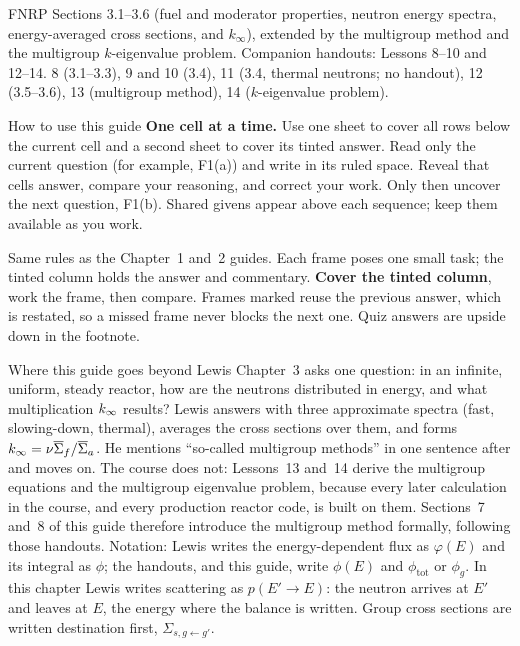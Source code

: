 \documentclass[compact]{ne630handout}
\newcommand{\Sg}[2]{\Sigma_{s,#1\gets#2}}
\begin{document}
 {FNRP Sections 3.1--3.6 (fuel and moderator properties, neutron energy spectra, energy-averaged cross sections, and $k_\infty$), extended by the multigroup method and the multigroup $k$-eigenvalue problem. Companion handouts: Lessons 8--10 and 12--14.}
 {8 (3.1--3.3), 9 and 10 (3.4), 11 (3.4, thermal neutrons; no handout), 12 (3.5--3.6), 13 (multigroup method), 14 ($k$-eigenvalue problem).}

\begin{KeyBox}{How to use this guide}
\ifguidehandwriting
\textbf{One cell at a time.} Use one sheet to cover all rows below the current cell and a second sheet to cover its tinted answer. Read only the current question (for example, F1(a)) and write in its ruled space. Reveal that cell\textquotesingle s answer, compare your reasoning, and correct your work. Only then uncover the next question, F1(b). Shared givens appear above each sequence; keep them available as you work.\par\smallskip
\fi
Same rules as the Chapter~1 and~2 guides. Each frame poses one small task; the tinted column holds the answer and commentary. \textbf{Cover the tinted column}, work the frame, then compare. Frames marked \Chain reuse the previous answer, which is restated, so a missed frame never blocks the next one. Quiz answers are upside down in the footnote.
\end{KeyBox}

\begin{KeyBox}{Where this guide goes beyond Lewis}
Chapter~3 asks one question: in an infinite, uniform, steady reactor, how are the neutrons distributed in energy, and what multiplication $k_\infty$ results? Lewis answers with three approximate spectra (fast, slowing-down, thermal), averages the cross sections over them, and forms $k_\infty=\nu\overline\Sigma_f/\overline\Sigma_a$. He mentions ``so-called multigroup methods'' in one sentence after  and moves on. The course does not: Lessons~13 and~14 derive the multigroup equations and the multigroup eigenvalue problem, because every later calculation in the course, and every production reactor code, is built on them. Sections~7 and~8 of this guide therefore introduce the multigroup method formally, following those handouts. Notation: Lewis writes the energy-dependent flux as $\varphi(E)$ and its integral as $\phi$; the handouts, and this guide, write $\phi(E)$ and $\phi_{\mathrm{tot}}$ or $\phi_g$. In this chapter Lewis writes scattering as $p(E'\to E)$: the neutron arrives at $E'$ and leaves at $E$, the energy where the balance is written. Group cross sections are written destination first, $\Sg{g}{g'}$.
\end{KeyBox}
\end{document}
